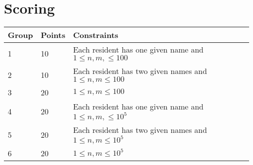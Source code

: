 \section*{Scoring}
\begin{tabular}{|l|l|l|}
\hline
Group & Points & Constraints \\ \hline
1     & 10   & Each resident has one given name and $1 \leq n, m, \leq 100$ \\ \hline
2     & 10   & Each resident has two given names and $1 \leq n, m \leq 100$ \\ \hline
3     & 20   & $1 \leq n, m \leq 100$ \\ \hline
4     & 20   & Each resident has one given name and $1 \leq n, m, \leq 10^5$ \\ \hline
5     & 20   & Each resident has two given names and $1 \leq n, m \leq 10^5$ \\ \hline
6     & 20   & $1 \leq n, m \leq 10^5$ \\ \hline
\end{tabular}
